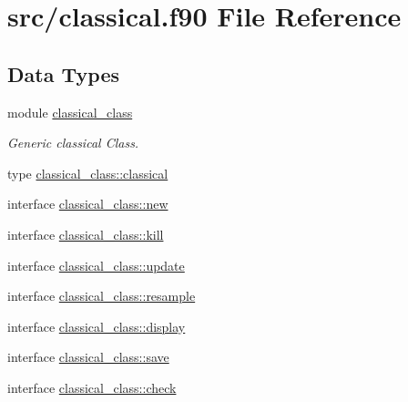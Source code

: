 \hypertarget{classical_8f90}{\section{src/classical.f90 File Reference}
\label{classical_8f90}
}
\subsection*{Data Types}
\begin{DoxyCompactItemize}
\item 
module \hyperlink{classclassical__class}{classical\+\_\+class}
\begin{DoxyCompactList}\small\item\em Generic classical Class. \end{DoxyCompactList}\item 
type \hyperlink{structclassical__class_1_1classical}{classical\+\_\+class\+::classical}
\item 
interface \hyperlink{interfaceclassical__class_1_1new}{classical\+\_\+class\+::new}
\item 
interface \hyperlink{interfaceclassical__class_1_1kill}{classical\+\_\+class\+::kill}
\item 
interface \hyperlink{interfaceclassical__class_1_1update}{classical\+\_\+class\+::update}
\item 
interface \hyperlink{interfaceclassical__class_1_1resample}{classical\+\_\+class\+::resample}
\item 
interface \hyperlink{interfaceclassical__class_1_1display}{classical\+\_\+class\+::display}
\item 
interface \hyperlink{interfaceclassical__class_1_1save}{classical\+\_\+class\+::save}
\item 
interface \hyperlink{interfaceclassical__class_1_1check}{classical\+\_\+class\+::check}
\end{DoxyCompactItemize}

